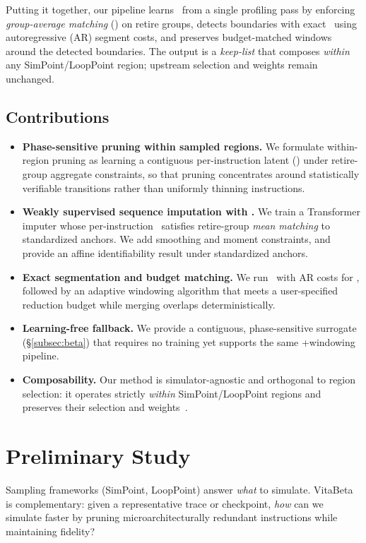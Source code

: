 Putting it together, our pipeline learns \pts\ from a single profiling pass by enforcing \emph{group-average matching} (\gam) on retire groups, detects boundaries with exact \pelt\ using autoregressive (AR) segment costs, and preserves budget-matched windows around the detected boundaries. The output is a \emph{keep-list} that composes \emph{within} any SimPoint/LoopPoint region; upstream selection and weights remain unchanged.
\subsection*{Contributions}
\begin{itemize}[leftmargin=*,noitemsep,topsep=1pt]
  \item \textbf{Phase-sensitive pruning within sampled regions.} We formulate within-region pruning as learning a contiguous per-instruction latent (\pts) under retire-group aggregate constraints, so that pruning concentrates around statistically verifiable transitions rather than uniformly thinning instructions.
  \item \textbf{Weakly supervised sequence imputation with \gam.} We train a Transformer imputer whose per-instruction \pts\ satisfies retire-group \emph{mean matching} to standardized anchors. We add smoothing and moment constraints, and provide an affine identifiability result under standardized anchors.
  \item \textbf{Exact segmentation and budget matching.} We run \pelt\ with AR costs for \cpd, followed by an adaptive windowing algorithm that meets a user-specified reduction budget while merging overlaps deterministically.
  \item \textbf{Learning-free fallback.} We provide a contiguous, phase-sensitive surrogate (\S\ref{subsec:beta}) that requires no training yet supports the same \cpd+windowing pipeline.
  \item \textbf{Composability.} Our method is simulator-agnostic and orthogonal to region selection: it operates strictly \emph{within} SimPoint/LoopPoint regions and preserves their selection and weights~\cite{simpoint-asplos02,simpoint03,simpoint-howto,looppoint-hpca22}.
\end{itemize}
\section{Preliminary Study}
Sampling frameworks (SimPoint, LoopPoint) answer \emph{what} to simulate. VitaBeta is complementary: given a representative trace or checkpoint, \emph{how} can we simulate faster by pruning microarchitecturally redundant instructions while maintaining fidelity?
